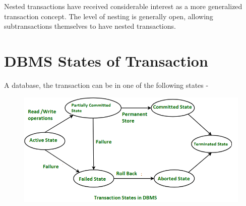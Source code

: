 \documentclass{article}
\begin{document}
Nested transactions have received considerable interest as a more generalized transaction concept. The level of nesting is generally open, allowing subtransactions themselves to have nested transactions. 


\section*{DBMS States of Transaction}

A database, the transaction can be in one of the following states -

\begin{figure}[h]
 \centering
 \includegraphics[scale=.7]{states}
\end{figure}
\end{document}
